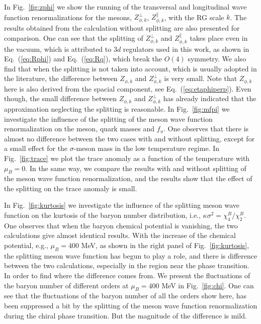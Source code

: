 \documentclass[%
reprint,
superscriptaddress,
showpacs,preprintnumbers,
 amsmath,amssymb,
 aps,
prd,
]{revtex4-1}
\def\Fig#1{Fig.~\ref{#1}} \def\Tab#1{Tab.~\ref{#1}}
\def\Eq#1{Eq.~(\ref{#1})}
\begin{document}
In \Fig{fig:zphi} we show the running of the transversal and longitudinal wave function renormalizations for the mesons, $Z_{\phi,k}^{\perp}$, $Z_{\phi,k}^{\parallel}$, with the RG scale $k$. The results obtained from the calculation without splitting are also presented for comparison. One can see that the splitting of $Z_{\phi,k}^{\perp}$ and $Z_{\phi,k}^{\parallel}$ takes place even in the vacuum, which is attributed to $3d$ regulators used in this work, as shown in \Eq{eq:Rphi} and \Eq{eq:Rq}, which break the $O(4)$ symmetry. We also find that when the splitting is not taken into account, which is usually adopted in the literature, the difference between $Z_{\phi,k}$ and $Z_{\phi,k}^{\perp}$ is very small. Note that $Z_{\phi,k}$ here is also derived from the spacial component, see \Eq{eq:etaphiperp}. Even though, the small difference between $Z_{\phi,k}$ and $Z_{\phi,k}^{\perp}$ has already indicated that the approximation neglecting the splitting is reasonable. In \Fig{fig:mfpi} we investigate the influence of the splitting of the meson wave function renormalization on the  meson, quark masses and $f_\pi$. One observes that there is almost no difference between the two cases with and without splitting, except for a small effect for the $\sigma$-meson mass in the low temperature regime. In \Fig{fig:trace} we plot the trace anomaly as a function of the temperature with $\mu_B=0$. In the same way, we compare the results with and without splitting of the meson wave function renormalization, and the results show that the effect of the splitting on the trace anomaly is small.

In \Fig{fig:kurtosis} we investigate the influence of the splitting meson wave function on the kurtosis of the baryon number distribution, i.e., $\kappa \sigma^2=\chi_4^{B}/\chi_2^{B}$. One observes that when the baryon chemical potential is vanishing, the two calculations give almost identical results. With the increase of the chemical potential, e.g., $\mu_B=400$ MeV, as shown in the right panel of \Fig{fig:kurtosis}, the splitting meson wave function has begun to play a role, and there is difference between the two calculations, especially in the region near the phase transition. In order to find where the difference comes from. We present the fluctuations of the baryon number of different orders at $\mu_B=400$ MeV in \Fig{fig:chi}. One can see that the fluctuations of the baryon number of all the orders show here, has been suppressed a bit by the splitting of the meson wave function renormalization during the chiral phase transition. But the magnitude of the difference is mild.
\end{document}
